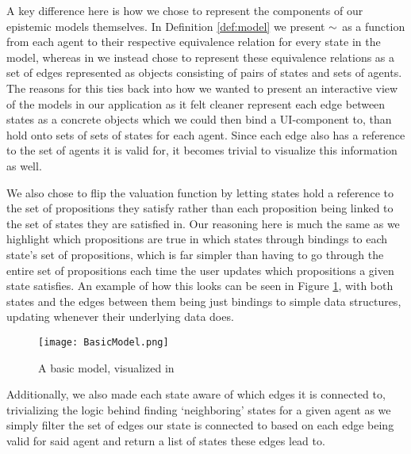 A key difference here is how we chose to represent the components of our epistemic models themselves.  In Definition \ref{def:model} we present $\sim$ as a function from each agent to their respective equivalence relation for every state in the model, whereas in \cname we instead chose to represent these equivalence relations as a set of edges represented as objects consisting of pairs of states and sets of agents. The reasons for this ties back into how we wanted to present an interactive view of the models in our application as it felt cleaner represent each edge between states as a concrete objects which we could then bind a UI-component to, than hold onto sets of sets of states for each agent. Since each edge also has a reference to the set of agents it is valid for, it becomes trivial to visualize this information as well.

We also chose to flip the valuation function by letting states hold a reference to the set of propositions they satisfy rather than each proposition being linked to the set of states they are satisfied in. Our reasoning here is much the same as we highlight which propositions are true in which states through bindings to each state's set of propositions, which is far simpler than having to go through the entire set of propositions each time the user updates which propositions a given state satisfies. An example of how this looks can be seen in Figure \ref{fig:basicModelVis}, with both states and the edges between them being just bindings to simple data structures, updating whenever their underlying data does.

\begin{figure}[H]
	\label{fig:basicModelVis}
	\caption{A basic model, visualized in \cname}
	\texttt{[image: BasicModel.png]}
\end{figure} 

Additionally, we also made each state aware of which edges it is connected to, trivializing the logic behind finding `neighboring' states for a given agent as we simply filter the set of edges our state is connected to based on each edge being valid for said agent and return a list of states these edges lead to.

